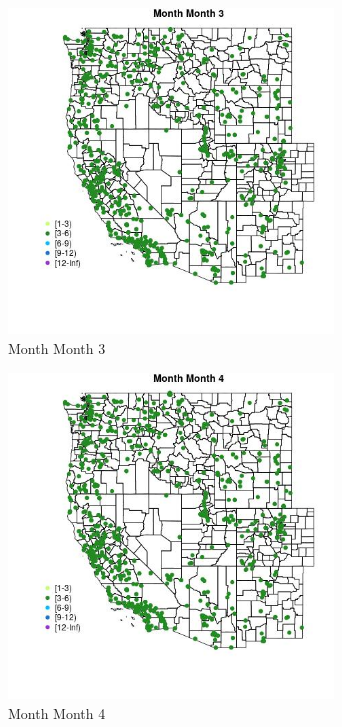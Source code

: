 \begin{figure} 
\centering  
\includegraphics[width=0.77\textwidth]{Code_Outputs/Report_ML_input_PM25_Step4_part_e_de_duplicated_aveswNAs_MapObsMo3Month.jpg} 
\caption{\label{fig:Report_ML_input_PM25_Step4_part_e_de_duplicated_aveswNAsMapObsMo3Month}Month Month 3} 
\end{figure} 
 

\begin{figure} 
\centering  
\includegraphics[width=0.77\textwidth]{Code_Outputs/Report_ML_input_PM25_Step4_part_e_de_duplicated_aveswNAs_MapObsMo4Month.jpg} 
\caption{\label{fig:Report_ML_input_PM25_Step4_part_e_de_duplicated_aveswNAsMapObsMo4Month}Month Month 4} 
\end{figure} 
 

